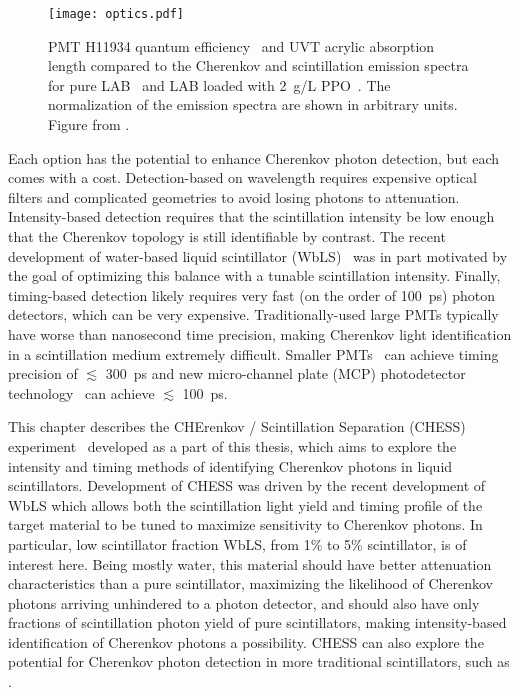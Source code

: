 \begin{figure}
	\centering
	\texttt{[image: optics.pdf]}
	\caption{\label{fig:optics} PMT H11934 quantum efficiency~\cite{h11934} and UVT acrylic absorption length compared to the Cherenkov and scintillation emission spectra for pure LAB~\cite{lab_emission} and LAB loaded with 2~g/L PPO~\cite{snop_private}. The normalization of the emission spectra are shown in arbitrary units. Figure from \cite{chess_nim}.}
\end{figure}

Each option has the potential to enhance Cherenkov photon detection, but each comes with a cost.
Detection-based on wavelength requires expensive optical filters and complicated geometries to avoid losing photons to attenuation.
Intensity-based detection requires that the scintillation intensity be low enough that the Cherenkov topology is still identifiable by contrast.
The recent development of water-based liquid scintillator (WbLS)~\cite{wbls} was in part motivated by the goal of optimizing this balance with a tunable scintillation intensity.
Finally, timing-based detection likely requires very fast (on the order of 100~ps) photon detectors, which can be very expensive.
Traditionally-used large PMTs typically have worse than nanosecond time precision, making Cherenkov light identification in a scintillation medium extremely difficult.
Smaller PMTs~\cite{h11934} can achieve timing precision of $\lesssim$ 300~ps and new micro-channel plate (MCP) photodetector technology~\cite{mcp, lappd, lappd2} can achieve  $\lesssim$ 100~ps.


This chapter describes the CHErenkov / Scintillation Separation (CHESS) experiment~\cite{chess_nim} developed as a part of this thesis, which aims to explore the intensity and timing methods of identifying Cherenkov photons in liquid scintillators. 
Development of CHESS was driven by the recent development of WbLS which allows both the scintillation light yield and timing profile of the target material to be tuned to maximize sensitivity to Cherenkov photons.  
In particular, low scintillator fraction WbLS, from 1\% to 5\% scintillator, is of interest here. 
Being mostly water, this material should have better attenuation characteristics than a pure scintillator, maximizing the likelihood of Cherenkov photons arriving unhindered to a photon detector, and should also have only fractions of scintillation photon yield of pure scintillators, making intensity-based identification of Cherenkov photons a possibility.
CHESS can also explore the potential for Cherenkov photon detection in more traditional scintillators, such as {\labppo}.

